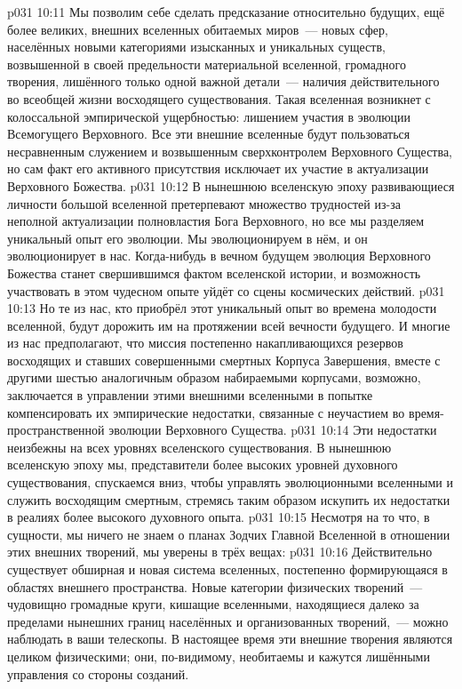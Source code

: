 \vs p031 10:11 Мы позволим себе сделать предсказание относительно будущих, ещё более великих, внешних вселенных обитаемых миров~--- новых сфер, населённых новыми категориями изысканных и уникальных существ, возвышенной в своей предельности материальной вселенной, громадного творения, лишённого только одной важной детали~--- наличия действительного  во всеобщей жизни восходящего существования. Такая вселенная возникнет с колоссальной эмпирической ущербностью: лишением участия в эволюции Всемогущего Верховного. Все эти внешние вселенные будут пользоваться несравненным служением и возвышенным сверхконтролем Верховного Существа, но сам факт его активного присутствия исключает их участие в актуализации Верховного Божества.
\vs p031 10:12 В нынешнюю вселенскую эпоху развивающиеся личности большой вселенной претерпевают множество трудностей из-за неполной актуализации полновластия Бога Верховного, но все мы разделяем уникальный опыт его эволюции. Мы эволюционируем в нём, и он эволюционирует в нас. Когда\hyp{}нибудь в вечном будущем эволюция Верховного Божества станет свершившимся фактом вселенской истории, и возможность участвовать в этом чудесном опыте уйдёт со сцены космических действий.
\vs p031 10:13 Но те из нас, кто приобрёл этот уникальный опыт во времена молодости вселенной, будут дорожить им на протяжении всей вечности будущего. И многие из нас предполагают, что миссия постепенно накапливающихся резервов восходящих и ставших совершенными смертных Корпуса Завершения, вместе с другими шестью аналогичным образом набираемыми корпусами, возможно, заключается в управлении этими внешними вселенными в попытке компенсировать их эмпирические недостатки, связанные с неучастием во время\hyp{}пространственной эволюции Верховного Существа.
\vs p031 10:14 Эти недостатки неизбежны на всех уровнях вселенского существования. В нынешнюю вселенскую эпоху мы, представители более высоких уровней духовного существования, спускаемся вниз, чтобы управлять эволюционными вселенными и служить восходящим смертным, стремясь таким образом искупить их недостатки в реалиях более высокого духовного опыта.
\vs p031 10:15 Несмотря на то что, в сущности, мы ничего не знаем о планах Зодчих Главной Вселенной в отношении этих внешних творений, мы уверены в трёх вещах:
\vs p031 10:16 Действительно существует обширная и новая система вселенных, постепенно формирующаяся в областях внешнего пространства. Новые категории физических творений~--- чудовищно громадные круги, кишащие вселенными, находящиеся далеко за пределами нынешних границ населённых и организованных творений,~--- можно наблюдать в ваши телескопы. В настоящее время эти внешние творения являются целиком физическими; они, по\hyp{}видимому, необитаемы и кажутся лишёнными управления со стороны созданий.
